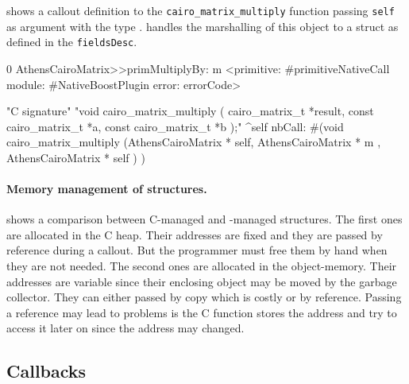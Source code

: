  shows a callout definition to the
 \texttt{cairo\_matrix\_multiply} function passing \texttt{self} as argument with the type .
\NB handles the marshalling of this object to a struct as defined in the \texttt{fieldsDesc}.

\begin{stcode}[
	label={lst:cairoCallouts},
	caption={Example of callouts using \ttt{cairo\_matrix\_t}}]{0}
AthensCairoMatrix>>primMultiplyBy: m
	<primitive: #primitiveNativeCall
	 module: #NativeBoostPlugin
     error: errorCode>

"C signature"
"void cairo_matrix_multiply (
                     cairo_matrix_t *result,
                     const cairo_matrix_t *a,
                     const cairo_matrix_t *b );"
	^self nbCall: #(void   cairo_matrix_multiply
		(AthensCairoMatrix * self,
		AthensCairoMatrix * m ,
		AthensCairoMatrix * self ) )
\end{stcode}


\paragraph{Memory management of structures.}
 shows a comparison between C-managed and \PH-managed structures.
The first ones are allocated in the C heap.
Their addresses are fixed and they are passed by reference during a callout.
But the programmer must free them by hand when they are not needed.
The second ones are allocated in the \PH object-memory.
Their addresses are variable since their enclosing object may be moved by the garbage collector.
They can either passed by copy which is costly or by reference.
Passing a reference may lead to problems is the C function stores the address and try to access it later on since the address may changed.


\subsection{Callbacks}

